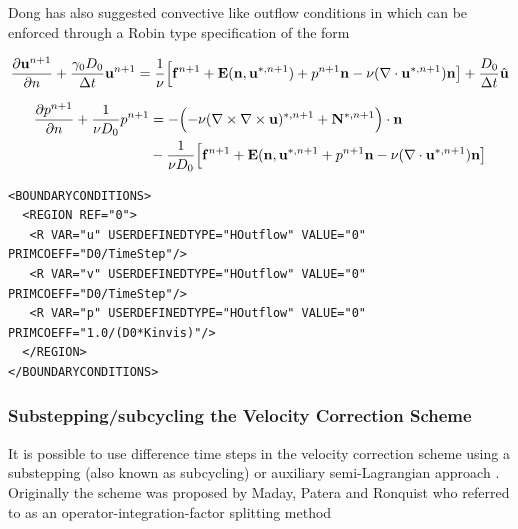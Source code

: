 Dong has also suggested convective like outflow conditions in
\cite{Dong15} which can be enforced through a Robin type specification
of the form

\begin{equation}
  \frac{\partial \mathbf{u}^{n+1}}{\partial n} + \frac{\gamma_0 D_0}{\Delta t} \mathbf{u}^{n+1} = \frac{1}{\nu}\Bigl[\mathbf{f}^{n+1} + \mathbf{E}(\mathbf{n},\mathbf{u}^{*,n+1}) + p^{n+1}\mathbf{n} -\nu(\nabla\cdot \mathbf{u}^{*,n+1}) \mathbf{n}
    \bigr] + \frac{D_0}{\Delta t}\hat{\mathbf{u}}
 \end{equation}

\begin{align}
  \frac{\partial p^{n+1}}{\partial n} + \frac{1}{\nu D_0} p^{n+1} &=
   - \Bigl( -\nu (\nabla \times \nabla \times   \mathbf{u})^{*,n+1} + \mathbf{N}^{*,n+1}\Bigr)\cdot \mathbf{n} \nonumber \\
 & - \frac{1}{\nu D_0}\Bigl[\mathbf{f}^{n+1} + \mathbf{E}(\mathbf{n},\mathbf{u}^{*,n+1} + p^{n+1}\mathbf{n} -\nu(\nabla\cdot \mathbf{u}^{*,n+1}) \mathbf{n}
   \bigr] 
 \end{align}


\begin{lstlisting}[style=XMLStyle]
<BOUNDARYCONDITIONS>
  <REGION REF="0">
   <R VAR="u" USERDEFINEDTYPE="HOutflow" VALUE="0" PRIMCOEFF="D0/TimeStep"/>
   <R VAR="v" USERDEFINEDTYPE="HOutflow" VALUE="0" PRIMCOEFF="D0/TimeStep"/>
   <R VAR="p" USERDEFINEDTYPE="HOutflow" VALUE="0" PRIMCOEFF="1.0/(D0*Kinvis)"/>
  </REGION>
</BOUNDARYCONDITIONS>
\end{lstlisting}

\subsubsection{Substepping/subcycling the Velocity Correction Scheme}

It is possible to use difference time steps in the velocity correction
scheme using a substepping (also known as subcycling) \cite{Sh03} or
auxiliary semi-Lagrangian approach \cite{XiShDoKa}. Originally the
scheme was proposed by Maday, Patera and Ronquist who referred to as
an operator-integration-factor splitting method \cite{MaPaRo}

